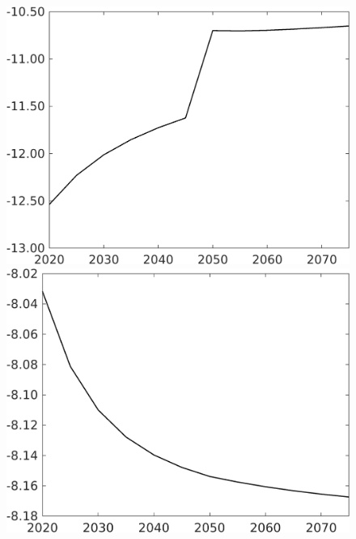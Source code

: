 \documentclass[12pt]{article}
\begin{document}
\begin{figure}[h!!]
\begin{minipage}[]{0.32\textwidth}
	\end{minipage}		
	\begin{minipage}[]{0.32\textwidth}
		\includegraphics[width=1\textwidth]{../../codding_model/own_basedOnFried/optimalPol_010922_revision/figures/all_13Sept22/CompTaufPER_bytaul_Equlab_Reg0_Lg_spillover0_nsk0_xgr0_knspil0_sep0_LFlimit1_emsbase0_countec0_GovRev0_etaa0.79_lgd0.png}
	\end{minipage}
	\begin{minipage}[]{0.32\textwidth}
		\includegraphics[width=1\textwidth]{../../codding_model/own_basedOnFried/optimalPol_010922_revision/figures/all_13Sept22/CompTaufPER_bytaul_Equlab_Reg0_Ln_spillover0_nsk0_xgr0_knspil0_sep0_LFlimit1_emsbase0_countec0_GovRev0_etaa0.79_lgd0.png}

\end{minipage}
\end{figure}
\end{document}
